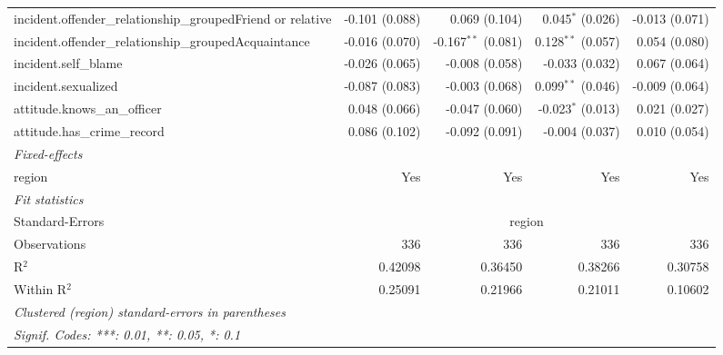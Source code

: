 \begin{tabular}{lrrrr}
	incident.offender\_relationship\_groupedFriend or relative      & -0.101 (0.088)         & 0.069 (0.104)          & 0.045$^{*}$ (0.026)   & -0.013 (0.071)\\   
	incident.offender\_relationship\_groupedAcquaintance            & -0.016 (0.070)         & -0.167$^{**}$ (0.081)  & 0.128$^{**}$ (0.057)  & 0.054 (0.080)\\   
	incident.self\_blame                                            & -0.026 (0.065)         & -0.008 (0.058)         & -0.033 (0.032)        & 0.067 (0.064)\\   
	incident.sexualized                                             & -0.087 (0.083)         & -0.003 (0.068)         & 0.099$^{**}$ (0.046)  & -0.009 (0.064)\\   
	attitude.knows\_an\_officer                                     & 0.048 (0.066)          & -0.047 (0.060)         & -0.023$^{*}$ (0.013)  & 0.021 (0.027)\\   
	attitude.has\_crime\_record                                     & 0.086 (0.102)          & -0.092 (0.091)         & -0.004 (0.037)        & 0.010 (0.054)\\   
	\midrule
	\emph{Fixed-effects}\\
	region                                                          & Yes                    & Yes                    & Yes                   & Yes\\  
	\midrule
	\emph{Fit statistics}\\
	Standard-Errors & \multicolumn{4}{c}{region} \\ 
	Observations                                                    & 336                    & 336                    & 336                   & 336\\  
	R$^2$                                                           & 0.42098                & 0.36450                & 0.38266               & 0.30758\\  
	Within R$^2$                                                    & 0.25091                & 0.21966                & 0.21011               & 0.10602\\  
	\midrule \midrule
	\multicolumn{5}{l}{\emph{Clustered (region) standard-errors in parentheses}}\\
	\multicolumn{5}{l}{\emph{Signif. Codes: ***: 0.01, **: 0.05, *: 0.1}}\\
\end{tabular}
\par\endgroup